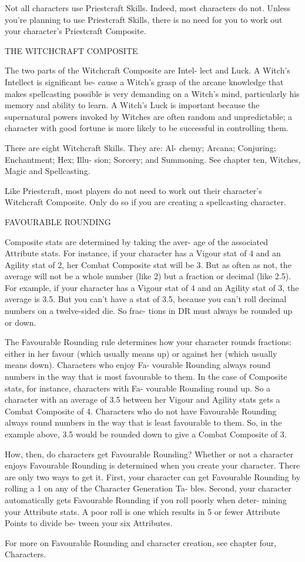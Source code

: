 \documentclass[11pt,twocolumn]{book}
\begin{document}
Not all characters use Priestcraft Skills. Indeed, most characters do not. Unless you’re planning to use Priestcraft Skills, there is no need for you to work out your character’s Priestcraft Composite.

THE WITCHCRAFT COMPOSITE

The two parts of the Witchcraft Composite are Intel- lect and Luck. A Witch’s Intellect is significant be- cause a Witch’s grasp of the arcane knowledge that makes spellcasting possible is very demanding on a Witch’s mind, particularly his memory and ability to learn. A Witch’s Luck is important because the supernatural powers invoked by Witches are often random and unpredictable; a character with good fortune is more likely to be successful in controlling them.

There are eight Witchcraft Skills. They are: Al- chemy; Arcana; Conjuring; Enchantment; Hex; Illu- sion; Sorcery; and Summoning. See chapter ten, Witches, Magic and Spellcasting.

Like Priestcraft, most players do not need to work out their character’s Witchcraft Composite. Only do so if you are creating a spellcasting character.

FAVOURABLE ROUNDING

Composite stats are determined by taking the aver- age of the associated Attribute stats. For instance, if your character has a Vigour stat of 4 and an Agility stat of 2, her Combat Composite stat will be 3. But as often as not, the average will not be a whole number (like 2) but a fraction or decimal (like 2.5). For example, if your character has a Vigour stat of 4 and an Agility stat of 3, the average is 3.5. But you can’t have a stat of 3.5, because you can’t roll decimal numbers on a twelve-sided die. So frac- tions in DR must always be rounded up or down.

The Favourable Rounding rule determines how your character rounds fractions: either in her favour (which usually means up) or against her (which usually means down). Characters who enjoy Fa- vourable Rounding always round numbers in the way that is most favourable to them. In the case of Composite stats, for instance, characters with Fa- vourable Rounding round up. So a character with an average of 3.5 between her Vigour and Agility stats gets a Combat Composite of 4. Characters who do not have Favourable Rounding always round numbers in the way that is least favourable to them. So, in the example above, 3.5 would be rounded down to give a Combat Composite of 3.

How, then, do characters get Favourable Rounding? Whether or not a character enjoys Favourable Rounding is determined when you create your character. There are only two ways to get it. First, your character can get Favourable Rounding by rolling a 1 on any of the Character Generation Ta- bles. Second, your character automatically gets Favourable Rounding if you roll poorly when deter- mining your Attribute stats. A poor roll is one which results in 5 or fewer Attribute Points to divide be- tween your six Attributes.

For more on Favourable Rounding and character creation, see chapter four, Characters.
\end{document}
